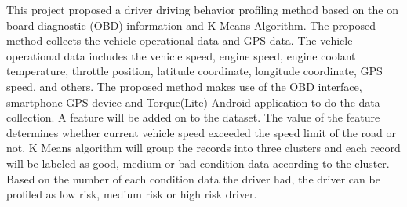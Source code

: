 
This project proposed a driver driving behavior profiling method based on the on board diagnostic (OBD) information and K Means Algorithm. The proposed method collects the vehicle operational data and GPS data. The vehicle operational data includes the vehicle speed, engine speed, engine coolant temperature, throttle position, latitude coordinate, longitude coordinate, GPS speed, and others. The proposed method makes use of the OBD interface, smartphone GPS device and Torque(Lite) Android application to do the data collection. A feature will be added on to the dataset. The value of the feature determines whether current vehicle speed exceeded the speed limit of the road or not. K Means algorithm will group the records into three clusters and each record will be labeled as good, medium or bad condition data according to the cluster. Based on the number of each condition data the driver had, the driver can be profiled as low risk, medium risk or high risk driver.